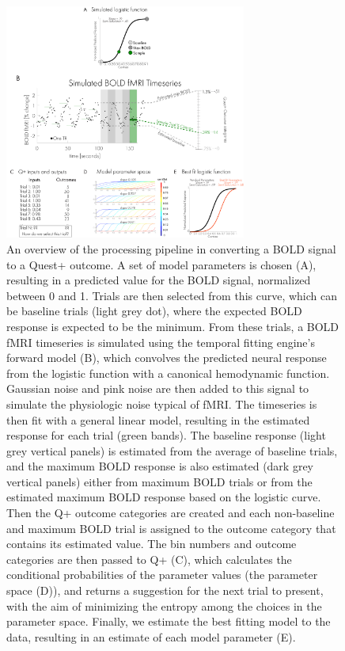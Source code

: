 \documentclass[
  english,
  man,floatsintext]{apa6}
\begin{document}
\newpage
\begin{figure}

{\centering \includegraphics[width=300px]{figures/Figure1} 

}

\caption{An overview of the processing pipeline in converting a BOLD signal to a Quest+ outcome. A set of model parameters is chosen (A), resulting in a predicted value for the BOLD signal, normalized between 0 and 1. Trials are then selected from this curve, which can be baseline trials (light grey dot), where the expected BOLD response is expected to be the minimum. From these trials, a BOLD fMRI timeseries is simulated using the temporal fitting engine's forward model (B), which convolves the predicted neural response from the logistic function with a canonical hemodynamic function. Gaussian noise and pink noise are then added to this signal to simulate the physiologic noise typical of fMRI. The timeseries is then fit with a general linear model, resulting in the estimated response for each trial (green bands). The baseline response (light grey vertical panels) is estimated from the average of baseline trials, and the maximum BOLD response is also estimated (dark grey vertical panels) either from maximum BOLD trials or from the estimated maximum BOLD response based on the logistic curve. Then the Q+ outcome categories are created and each non-baseline and maximum BOLD trial is assigned to the outcome category that contains its estimated value. The bin numbers and outcome categories are then passed to Q+ (C), which calculates the conditional probabilities of the parameter values (the parameter space (D)), and returns a suggestion for the next trial to present, with the aim of minimizing the entropy among the choices in the parameter space. Finally, we estimate the best fitting model to the data, resulting in an estimate of each model parameter (E).
\newpage}\label{fig:methods-figure}
\end{figure}
\end{document}
